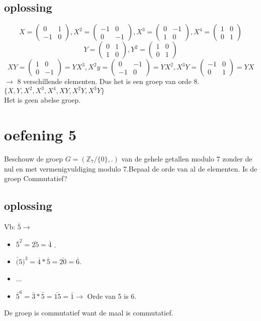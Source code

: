 \documentclass[12pt,a4paper]{article}
\begin{document}
\subsection*{oplossing}
\[
X=
\begin{pmatrix}
0 &1\\
-1&0
\end{pmatrix}
, X^2=
\begin{pmatrix}
-1&0\\
0&-1
\end{pmatrix}
,X^3=
\begin{pmatrix}
0 & -1\\
1&0
\end{pmatrix}
,X^4=
\begin{pmatrix}
1 & 0\\
0 & 1
\end{pmatrix}
\]
\[
Y=
\begin{pmatrix}
0 & 1\\
1 & 0
\end{pmatrix}
,Y^2=
\begin{pmatrix}
1&0\\
0&1
\end{pmatrix}
\]
\[
XY=
\begin{pmatrix}
1 &0\\
0 &-1
\end{pmatrix}
=YX^3,X^2y=
\begin{pmatrix}
0 &- 1\\
-1 &0
\end{pmatrix}
=YX^2,X^3Y=
\begin{pmatrix}
-1 & 0\\
0&1
\end{pmatrix}
=YX
\]
$\rightarrow$ 8 verschillende elementen. Dus het is een groep van orde 8.
\\$\{X,Y,X^2,X^3,X^4,XY,X^2Y,X^3Y\}$
\\Het is geen abelse groep.
\section*{oefening 5}

Beschouw de groep $G=( \mathbb{Z}_7 /\{0\},.)$ van de gehele getallen modulo 7 zonder de nul en met vermenigvuldiging modulo 7.Bepaal de orde van al de elementen. Is de groep Commutatief?
\subsection*{oplossing}
Vb: $\bar{5} \rightarrow$
\begin{itemize}
\item $\bar{5}^2=\bar{25}=\bar{4}$ .
\item $\bar(5)^3=\bar{4}*\bar{5}=\bar{20}=\bar{6}$.
\item ...
\item $\bar{5}^6=\bar{3}*\bar{5}=\bar{15}=\bar{1} \rightarrow$ Orde van 5 is 6.
\end{itemize}
De groep is commutatief want de maal is commutatief.
\pagebreak
\end{document}
